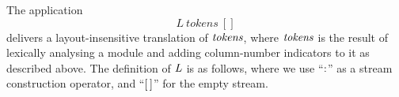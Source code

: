 The application
\[
L~tokens~[]
\]
delivers a layout-insensitive translation of \mbox{$\it tokens$}, where \mbox{$\it tokens$}
is the result of lexically analysing a module and adding column-number
indicators to it as described above.
The definition of \mbox{$\it L$} is as follows, where we use ``\mbox{$\it :$}'' as a stream
construction operator, and ``\mbox{$\it [\,]$}'' for the empty stream.

